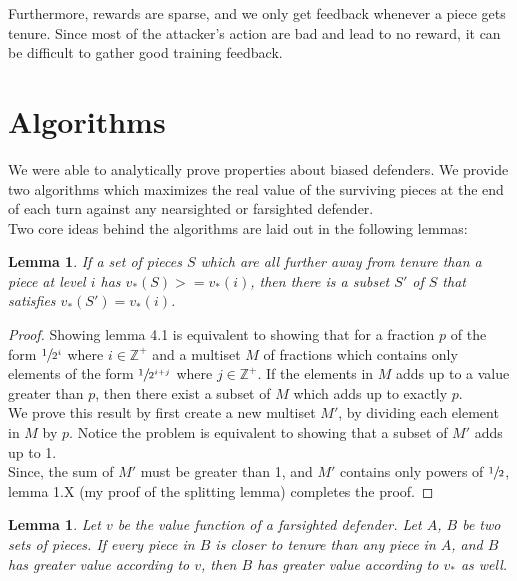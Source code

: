 \documentclass{article}
\theoremstyle{plain}
\newtheorem{lem}[thm]{Lemma}
\theoremstyle{definition}
\theoremstyle{remark}
\begin{document}
Furthermore, rewards are sparse, and we only get feedback whenever a piece gets tenure. Since most of the attacker's action are bad and lead to no reward, it can be difficult to gather good training feedback.
\section{Algorithms }
We were able to analytically prove properties about biased defenders. We provide two algorithms which maximizes the real value of the surviving pieces at the end of each turn against any nearsighted or farsighted defender.\\

Two core ideas behind the algorithms  are laid out in the following lemmas:

\begin{lem}
  If a set of pieces $S$ which are all further away from tenure than a piece at level $i$ has $v_{*}(S) >= v_{*}(i)$, then there is a subset $S'$ of $S$ that satisfies $v_{*}(S') = v_{*}(i)$.
\end{lem}


\begin{proof}
 Showing lemma 4.1 is equivalent to showing that for a fraction $p$ of the form $\sfrac{1}{2^i}$ where $i \in \mathbb{Z}^+$ and a multiset $M$ of fractions which contains only elements of the form $\sfrac{1}{2^{i+j}}$ where $j \in \mathbb{Z}^+$. If the elements in $M$ adds up to a value greater than $p$, then there exist a subset of $M$ which adds up to exactly $p$. \\
 
We prove this result by first create a new multiset $M'$, by dividing each element in $M$ by $p$. Notice the problem is equivalent to showing that a subset of $M'$ adds up to 1. \\

Since, the sum of $M'$ must be greater than 1, and $M'$ contains only powers of $\sfrac{1}{2}$, lemma 1.X (my proof of the splitting lemma) completes the proof.
\end{proof}

\begin{lem}
  Let $v$ be the value function of a farsighted defender. Let $A$, $B$ be two sets of pieces. If every piece in $B$ is closer to tenure than any piece in $A$, and  $B$ has greater value according to $v$, then $B$ has greater value according to $v_{*}$ as well.
\end{lem}
\end{document}
